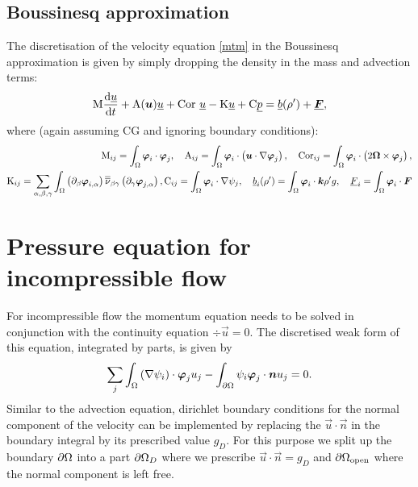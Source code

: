 \subsection{Boussinesq approximation}
The discretisation of the velocity equation \eqref{mtm} 
in the Boussinesq approximation is given by simply 
dropping the density in the mass and advection terms:
\begin{equation*}
  \mathrm{M} \frac{\mathrm{d}\underline{u}}{\mathrm{d} t}
    +\mathrm{A}({\mbox{\boldmath$u$}})\underline{u}
    +\mathrm{Cor}~\underline{u}
    -\mathrm{K}\underline{u}    
    +\mathrm{C} \underline{p}
    =\underline{b}(\rho')+\underline{{\mbox{\boldmath$F$}}},
\end{equation*}
where (again assuming CG and ignoring boundary conditions):
\begin{equation*}
\begin{split}
  \mathrm{M}_{ij}=\int_\Omega {\mbox{\boldmath$\varphi$}}_i\cdot{\mbox{\boldmath$\varphi$}}_j, \quad
  \mathrm{A}_{ij}=\int_\Omega {\mbox{\boldmath$\varphi$}}_i\cdot\left({\mbox{\boldmath$u$}}\cdot\nabla {\mbox{\boldmath$\varphi$}}_j\right), \quad
  \mathrm{Cor}_{ij}=
    \int_\Omega {\mbox{\boldmath$\varphi$}}_i\cdot\left(2{\mbox{\boldmath$\Omega$}}\times{\mbox{\boldmath$\varphi$}}_j\right), \\
  \mathrm{K}_{ij}=\sum_{\alpha,\beta,\gamma} \int_\Omega 
    \left(\partial_\beta{\mbox{\boldmath$\varphi$}}_{i,\alpha}\right) \overline{\overline{\nu}}_{\beta\gamma}
      \left(\partial_\gamma {\mbox{\boldmath$\varphi$}}_{j,\alpha}\right),
  \mathrm{C}_{ij}=\int_\Omega {\mbox{\boldmath$\varphi$}}_i\cdot\nabla\psi_j, \quad
    \underline{b}_i(\rho')=\int_\Omega {\mbox{\boldmath$\varphi$}}_i\cdot{\mbox{\boldmath$k$}}\rho'g,\quad
    \underline{F}_i=\int_\Omega {\mbox{\boldmath$\varphi$}}_i \cdot{\mbox{\boldmath$F$}}
\end{split}
\end{equation*}

\section{Pressure equation for incompressible flow}
For incompressible flow the momentum equation needs to be solved 
in conjunction with the continuity equation 
$\div\vec u=0$. The discretised weak form of 
this equation, integrated by parts, is given by
\begin{equation*}
  \sum_j \int_\Omega \left(\nabla\psi_i\right)\cdot{\mbox{\boldmath$\varphi$}}_j u_j - 
    \int_{\partial\Omega} \psi_i{\mbox{\boldmath$\varphi$}}_j\cdot{\mbox{\boldmath$n$}} u_j = 0.
\end{equation*}
Similar to the advection equation, dirichlet boundary conditions for the 
normal component of the velocity can be implemented by replacing
the $\vec u\cdot\vec n$ in the boundary integral by its prescribed 
value $g_D$. For this purpose we split up the 
boundary ${\partial\Omega}$ into a part
${\partial\Omega}_D$ where we prescribe $\vec u\cdot\vec n=g_D$ and 
${\partial\Omega}_{\mathrm{open}}$ where the normal component is left free.

